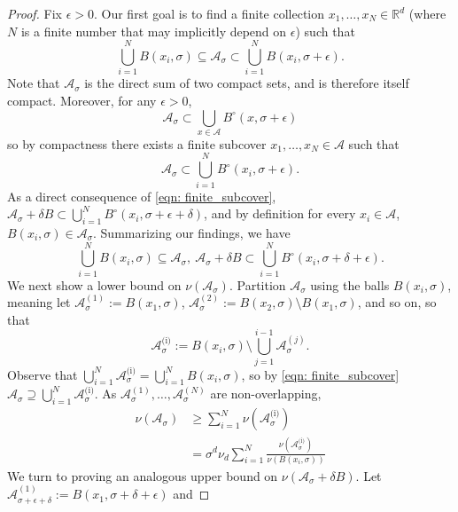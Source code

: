 \documentclass[11pt,twoside]{article}
\newcommand{\Reals}{\mathbb{R}}
\newcommand{\Rd}{\Reals^d}
\newcommand{\1}{\mathbf{1}}
\newcommand{\Aset}{\mathcal{A}}
\newcommand{\Asig}{\Aset_{\sigma}}
\begin{document}
\begin{proof}
	
	Fix $\epsilon > 0$. Our first goal is to find a finite collection $x_1, \ldots, x_N \in \Rd$ (where $N$ is a finite number that may implicitly depend on $\epsilon$) such that
	\begin{equation*}
	\bigcup_{i = 1}^{N} B(x_i, \sigma) \subseteq \Asig \subset \bigcup_{i = 1}^{N} B(x_i, \sigma + \epsilon).
	\end{equation*}
	Note that $\Asig$ is the direct sum of two compact sets, and is therefore itself compact. Moreover, for any $\epsilon > 0$,
	\begin{equation*}
	\Asig \subset \bigcup_{x \in \Aset} B^{\circ}(x,\sigma + \epsilon)
	\end{equation*}
	so by compactness there exists a finite subcover $x_1, \ldots,x_N \in \Aset$ such that
	\begin{equation}
	\label{eqn: finite_subcover}
	\Asig \subset \bigcup_{i = 1}^{N} B^{\circ}(x_i,\sigma + \epsilon).
	\end{equation}
	As a direct consequence of \eqref{eqn: finite_subcover}, $\Asig + \delta B \subset \bigcup_{i = 1}^{N} B^{\circ}(x_i,\sigma + \epsilon + \delta)$, and by definition for every $x_i \in \Aset$, $B(x_i,\sigma) \in \Asig$. Summarizing our findings, we have
	\begin{equation}
	\label{eqn: finite_subcover-1}
	\bigcup_{i = 1}^{N} B(x_i,\sigma) \subseteq \Asig  ,~\Asig + \delta B \subset \bigcup_{i = 1}^{N} B^{\circ}(x_i,\sigma + \delta + \epsilon).
	\end{equation}
\noindent	We next show a lower bound on $\nu(\Asig)$. Partition $\Asig$ using the balls $B(x_i,\sigma)$, meaning let $\Aset_{\sigma}^{(1)} := B(x_1,\sigma)$, $\Aset_{\sigma}^{(2)} := B(x_2,\sigma) \setminus B(x_1,\sigma)$, and so on, so that
	\begin{equation*}
	\Aset_{\sigma}^{\text{(i)}} := B(x_i,\sigma) \setminus \bigcup_{j = 1}^{i - 1} \Aset_{\sigma}^{(j)}. \tag{$i = 1,\ldots,N$}
	\end{equation*}
	Observe that $\bigcup_{i = 1}^{N} \Asig^{\text{(i)}} = \bigcup_{i = 1}^{N} B(x_i,\sigma)$, so by \eqref{eqn: finite_subcover} $\Asig \supseteq \bigcup_{i = 1}^{N} \Asig^{\text{(i)}}$. As $\Asig^{(1)},\ldots, \Asig^{(N)}$ are non-overlapping,
	\begin{align*}
	\nu(\Asig) & \geq \sum_{i = 1}^{N} \nu(\Asig^{\text{(i)}}) \\
	& = \sigma^d \nu_d \sum_{i = 1}^{N}  \frac{\nu(\Asig^{\text{(i)}})}{\nu(B(x_i,\sigma))}
	\end{align*}
	We turn to proving an analogous upper bound on $\nu(\Asig + \delta B)$. Let $\Aset_{\sigma + \epsilon + \delta}^{(1)} := B(x_1,\sigma + \delta + \epsilon)$ and

\end{proof}
\end{document}
